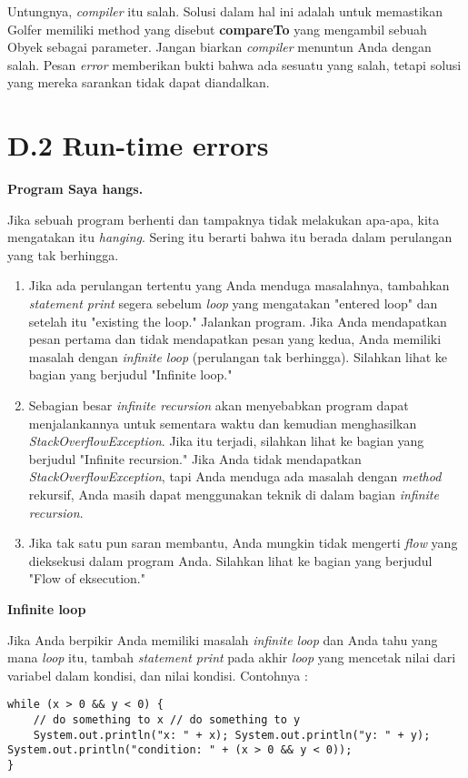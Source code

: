 \documentclass[12pt,b5paper,openright,twoside]{book}
\begin{document}
\noindent Untungnya, \textit{compiler} itu salah. Solusi dalam hal ini adalah untuk memastikan Golfer memiliki method yang disebut \textbf{compareTo} yang mengambil sebuah Obyek sebagai parameter.
Jangan biarkan \textit{compiler} menuntun Anda dengan salah. Pesan \textit{error} memberikan bukti bahwa ada sesuatu yang salah, tetapi solusi yang mereka sarankan tidak dapat diandalkan.

\section{D.2 Run-time errors}

\noindent \textbf{Program Saya hangs.}

\noindent Jika sebuah program berhenti dan tampaknya tidak melakukan apa-apa, kita mengatakan itu \textit{hanging}. Sering itu berarti bahwa itu berada dalam perulangan yang tak berhingga.
\begin{enumerate}
    \item Jika ada perulangan tertentu yang Anda menduga masalahnya, tambahkan \textit{statement print} segera sebelum \textit{loop} yang mengatakan "entered loop" dan setelah itu "existing the loop." Jalankan program. Jika Anda mendapatkan pesan pertama dan tidak mendapatkan pesan yang kedua, Anda memiliki masalah dengan \textit{infinite loop} (perulangan tak berhingga). Silahkan lihat ke bagian yang berjudul "Infinite loop."
    \item Sebagian besar \textit{infinite recursion} akan menyebabkan program dapat menjalankannya untuk sementara waktu dan kemudian menghasilkan \textit{StackOverflowException}. Jika itu terjadi, silahkan lihat ke bagian yang berjudul "Infinite recursion." Jika Anda tidak mendapatkan \textit{StackOverflowException}, tapi Anda menduga ada masalah dengan \textit{method} rekursif, Anda masih dapat menggunakan teknik di dalam bagian \textit{infinite recursion}.
    \item Jika tak satu pun saran membantu, Anda mungkin tidak mengerti \textit{flow} yang dieksekusi dalam program Anda. Silahkan lihat ke bagian yang berjudul "Flow of eksecution."
\end{enumerate}

\noindent \textbf{Infinite loop}

\noindent Jika Anda berpikir Anda memiliki masalah \textit{infinite loop} dan Anda tahu yang mana \textit{loop} itu, tambah \textit{statement print} pada akhir \textit{loop} yang mencetak nilai dari variabel dalam kondisi, dan nilai kondisi.
Contohnya : 
\begin{lstlisting}
while (x > 0 && y < 0) { 
    // do something to x // do something to y
    System.out.println("x: " + x); System.out.println("y: " + y); System.out.println("condition: " + (x > 0 && y < 0));
}
\end{lstlisting}
\end{document}
